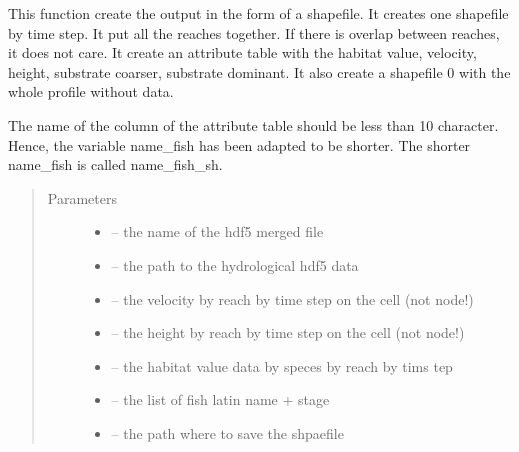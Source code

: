 \documentclass[letterpaper,10pt,english]{sphinxmanual}
\begin{document}

\begin{fulllineitems}
\label{\detokenize{index:src.calcul_hab.save_hab_shape}}
This function create the output in the form of a shapefile. It creates one shapefile by time step. It put
all the reaches together. If there is overlap between reaches, it does not care. It create an attribute table
with the habitat value, velocity, height, substrate coarser, substrate dominant. It also create a shapefile
0 with the whole profile without data.

The name of the column of the attribute table should be less than 10 character. Hence, the variable name\_fish
has been adapted to be shorter. The shorter name\_fish is called name\_fish\_sh.
\begin{quote}\begin{description}
\item[{Parameters}] \leavevmode\begin{itemize}
\item {} 
 -- the name of the hdf5 merged file

\item {} 
 -- the path to the hydrological hdf5 data

\item {} 
 -- the velocity by reach by time step on the cell (not node!)

\item {} 
 -- the height by reach by time step on the cell (not node!)

\item {} 
 -- the habitat value data by speces by reach by tims tep

\item {} 
 -- the list of fish latin name + stage

\item {} 
 -- the path where to save the shpaefile


\end{itemize}
\end{description}
\end{quote}
\end{fulllineitems}
\end{document}
